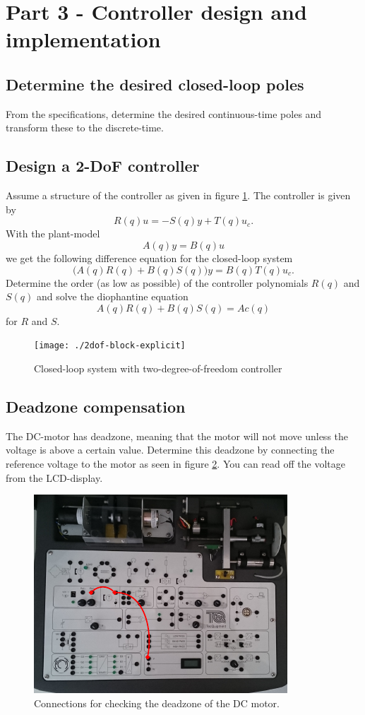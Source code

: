 \documentclass[a4paper]{scrartcl}
\begin{document}
\section*{Part 3 - Controller design and implementation}
\label{sec-5}
\subsection*{Determine the desired closed-loop poles}
\label{sec-5-1}
From the specifications, determine the desired continuous-time poles and transform these to the discrete-time. 

\subsection*{Design a 2-DoF controller}
\label{sec-5-2}
Assume a structure of the controller as given in figure \ref{fig:2dof}. The controller is given by 
\[ R(q)u = -S(q)y + T(q)u_c. \]
With the plant-model
\[ A(q)y = B(q)u\]
we get the following difference equation for the closed-loop system
\[ \big( A(q)R(q) + B(q)S(q) \big) y = B(q)T(q) u_c. \]
Determine the order (as low as possible) of the controller polynomials $R(q)$ and $S(q)$ and solve the diophantine equation 
\[ A(q)R(q) + B(q)S(q)  = Ac(q) \]
for $R$ and $S$. 

\begin{figure}
\begin{center}
\texttt{[image: ./2dof-block-explicit]}
\caption{Closed-loop system with two-degree-of-freedom controller}
\label{fig:2dof}
\end{center}
\end{figure}

\subsection*{Deadzone compensation}
\label{sec-5-3}
The DC-motor has  deadzone, meaning that the motor will not move unless the voltage is above a certain value. Determine this deadzone by connecting the reference voltage to the motor as seen in figure \ref{fig:deadzone-experiment}. You can read off the voltage from the LCD-display.
\begin{figure}
\begin{center}
\includegraphics[width=0.6\linewidth]{figures/deadzone-setup}
\caption{Connections for checking the deadzone of the DC motor.}
\label{fig:deadzone-experiment}
\end{center}
\end{figure}
\end{document}
